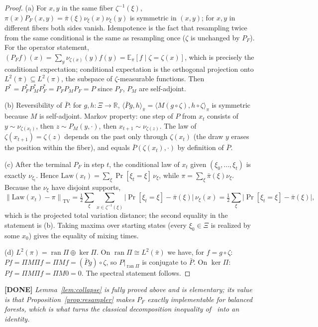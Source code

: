 \documentclass[11pt]{article}
\newcommand{\done}[1]{\medskip\noindent\textcolor{donecol}{\textbf{[DONE]} \emph{#1}}\medskip}
\newcommand{\R}{\mathbb{R}}
\newcommand{\E}{\mathbb{E}}
\newcommand{\tv}[1]{\left\lVert #1 \right\rVert_{\mathrm{TV}}}
\begin{document}
\begin{proof}
(a) For $x, y$ in the same fiber $\zeta^{-1}(\xi)$,
$\pi(x) P_F(x,y) = \bar\pi(\xi) \nu_\xi(x) \nu_\xi(y)$ is symmetric in
$(x,y)$; for $x, y$ in different fibers both sides vanish. Idempotence is
the fact that resampling twice from the same conditional is the same as
resampling once ($\zeta$ is unchanged by $P_F$). For the operator
statement, $(P_F f)(x) = \sum_y \nu_{\zeta(x)}(y) f(y) =
\E_\pi[f \mid \zeta = \zeta(x)]$, which is precisely the conditional
expectation; conditional expectation is the orthogonal projection onto
$L^2(\bar\pi) \subseteq L^2(\pi)$, the subspace of $\zeta$-measurable
functions. Then $P^* = P_F^* P_M^* P_F^* = P_F P_M P_F = P$ since $P_F$,
$P_M$ are self-adjoint.

(b) Reversibility of $\bar P$: for $g, h : \Xi \to \R$,
$\langle \bar P g, h \rangle_{\bar\pi} = \langle M (g \circ \zeta),
h \circ \zeta \rangle_{\pi}$ is symmetric because $M$ is self-adjoint.
Markov property: one step of $P$ from $x_t$ consists of $y \sim
\nu_{\zeta(x_t)}$, then $z \sim P_M(y, \cdot)$, then $x_{t+1} \sim
\nu_{\zeta(z)}$. The law of $\zeta(x_{t+1}) = \zeta(z)$ depends on the past
only through $\zeta(x_t)$ (the draw $y$ erases the position within the
fiber), and equals $\bar P(\zeta(x_t), \cdot)$ by definition of $\bar P$.

(c) After the terminal $P_F$ in step $t$, the conditional law of $x_t$
given $(\xi_0, \ldots, \xi_t)$ is exactly $\nu_{\xi_t}$. Hence
$\mathrm{Law}(x_t) = \sum_\xi \Pr[\xi_t = \xi]\, \nu_\xi$, while $\pi =
\sum_\xi \bar\pi(\xi) \nu_\xi$. Because the $\nu_\xi$ have disjoint
supports,
\[
  \tv{\mathrm{Law}(x_t) - \pi}
   = \tfrac12 \sum_{\xi} \sum_{x \in \zeta^{-1}(\xi)}
     \bigl| \Pr[\xi_t = \xi] - \bar\pi(\xi) \bigr|\, \nu_\xi(x)
   = \tfrac12 \sum_{\xi} \bigl| \Pr[\xi_t = \xi] - \bar\pi(\xi) \bigr|,
\]
which is the projected total variation distance; the second equality in the
statement is (b). Taking maxima over starting states (every $\xi_0 \in \Xi$
is realized by some $x_0$) gives the equality of mixing times.

(d) $L^2(\pi) = \operatorname{ran} \Pi \oplus \ker \Pi$. On
$\operatorname{ran} \Pi \cong L^2(\bar\pi)$ we have, for $f = g \circ
\zeta$: $P f = \Pi M \Pi f = \Pi M f = (\bar P g) \circ \zeta$, so
$P|_{\operatorname{ran}\Pi}$ is conjugate to $\bar P$. On $\ker \Pi$:
$P f = \Pi M \Pi f = \Pi M 0 = 0$. The spectral statement follows.
\end{proof}

\done{Lemma~\ref{lem:collapse} is fully proved above and is elementary; its
value is that Proposition~\ref{prop:resampler} makes $P_F$ \emph{exactly}
implementable for balanced forests, which is what turns the classical
decomposition inequality of~\cite{madras2002decomposition} into an identity.}
\end{document}
